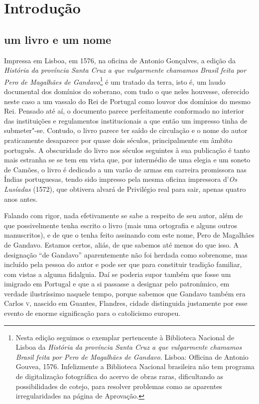 
\chapter[Introdução, \emph{por Clara C.~Santos e Ricardo M.~Valle}]{Introdução}

\section{um livro e um nome}

Impressa em Lisboa, em 1576, na oficina de Antonio Gonçalves, a edição
da \textit{História da província Santa Cruz a que vulgarmente chamamos Brasil
feita por Pero de Magalhães de Gandavo}\footnote{ Nesta edição
seguimos o exemplar pertencente à Biblioteca Nacional de Lisboa da
\textit{História da província Santa Cruz a que vulgarmente chamamos Brasil
feita por Pero de Magalhães de Gandavo}. Lisboa: Officina de Antonio
Gouvea, 1576. Infelizmente a Biblioteca Nacional brasileira não tem
programa de digitalização fotográfica do acervo de obras raras,
dificultando as possibilidades de cotejo, para resolver problemas como
as aparentes irregularidades na página de Aprovação.} é um tratado da terra, isto
é, um laudo documental dos domínios do soberano, com tudo o que neles
houvesse, oferecido neste caso a um vassalo do Rei de Portugal como
louvor dos domínios do mesmo Rei. Pensado até aí, o documento parece
perfeitamente conformado no interior das instituições e regulamentos
institucionais a que então um impresso tinha de submeter"-se. Contudo, o
livro parece ter saído de circulação e o nome do autor praticamente
desaparece por quase dois séculos, principalmente em âmbito português.
A obscuridade do livro nos séculos seguintes à sua publicação é tanto
mais estranha se se tem em vista que, por intermédio de uma elegia e um
soneto de Camões, o livro é dedicado a um varão de armas em carreira
promissora nas Índias portuguesas, tendo sido impresso pela mesma
oficina impressora d'\textit{Os Lusíadas} (1572), que obtivera
alvará de Privilégio real para sair, apenas quatro anos antes.

Falando com rigor, nada efetivamente se sabe a respeito de seu autor,
além de que possivelmente tenha escrito o livro (mais uma ortografia e
alguns outros manuscritos), e de que o tenha feito assinando com este
nome, Pero de Magalhães de Gandavo. Estamos certos, aliás, de que
sabemos até menos do que isso. A designação ``de Gandavo'' 
aparentemente não foi herdada como sobrenome, mas incluído pela pessoa 
do autor e pode ser que para constituir tradição familiar, com vistas a alguma 
fidalguia. Daí se poderia supor também que fosse um imigrado em Portugal 
e que a si passasse a designar pelo patronímico, em verdade ilustríssimo naquele tempo, 
porque sabemos que Gandavo também era Carlos \textsc{v}, nascido em Guantes, 
Flandres, cidade distinguida justamente por esse evento de enorme 
significação para o catolicismo europeu.

